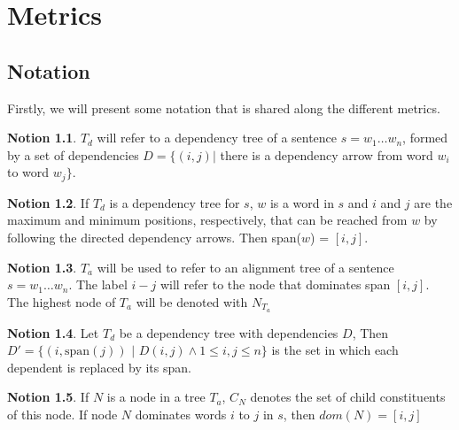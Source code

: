 \documentclass[a4paper, 11pt]{report}
\theoremstyle{definition}
\newtheorem{notion}{Notion}
\theoremstyle{plain}
\begin{document}
%
%

\chapter{Metrics}
\label{appendix:metric}

\section{Notation}

Firstly, we will present some notation that is shared along the different metrics.

\begin{notion}
$T_d$ will refer to a dependency tree of a sentence $s = w_1 \dots w_n$, formed by a set of dependencies $D = \{ (i,j) |$ there is a dependency arrow from word $w_i$ to word $w_j \}$.
\end{notion}

\begin{notion}
If $T_d$ is a dependency tree for $s$, $w$ is a word in $s$ and $i$ and $j$ are the maximum and minimum positions, respectively, that can be reached from $w$ by following the directed dependency arrows. Then span($w$) = $[i,j]$.
\end{notion}

\begin{notion}
$T_a$ will be used to refer to an alignment tree of a sentence $s = w_1 \dots w_n$. The label $i-j$ will refer to the node that dominates span $[i,j]$. The highest node of $T_a$ will be denoted with $N_{T_a}$
\end{notion}

\begin{notion}
Let $T_d$ be a dependency tree with dependencies $D$, Then $D' = \{ (i,\textrm{span}(j))$ $|$ $D(i,j) \land 1 \leq i,j \leq n \}$ is the set in which each dependent is replaced by its span.
\end{notion}

\begin{notion}
If $N$ is a node in a tree $T_a$, $C_N$ denotes the set of child constituents of this node. If node $N$ dominates words $i$ to $j$ in $s$, then $dom(N)= [i,j]$
\end{notion}
\end{document}
